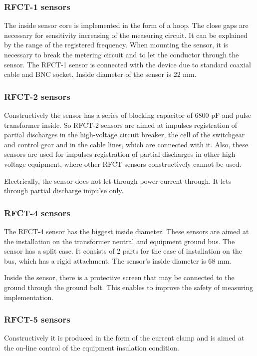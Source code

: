 \subsubsection{RFCT-1 sensors}
The inside sensor core is implemented in the form of a hoop. The close gaps are necessary for sensitivity increasing of the measuring circuit. It can be explained by the range of the registered frequency. When mounting the sensor, it is necessary to break the metering circuit and to let the conductor through the sensor. The RFCT-1 sensor is connected with the device due to standard coaxial cable and BNC socket. Inside diameter of the sensor is 22 mm. 

\subsubsection{RFCT-2 sensors}
Constructively the sensor has a series of blocking capacitor of 6800 pF and pulse transformer inside. So RFCT-2 sensors are aimed at impulses registration of partial discharges in the high-voltage circuit breaker, the cell of the switchgear and control gear and in the cable lines, which are connected with it. Also, these sensors are used for impulses registration of partial discharges in other high-voltage equipment, where other RFCT sensors constructively cannot be used.

Electrically, the sensor does not let through power current through. It lets through partial discharge impulse only.

\subsubsection{RFCT-4 sensors}
The RFCT-4 sensor has the biggest inside diameter. These sensors are aimed at the installation on the transformer neutral and equipment ground bus. The sensor has a split case. It consists of 2 parts for the ease of installation on the bus, which has a rigid attachment. The sensor’s inside diameter is 68 mm.

Inside the sensor, there is a protective screen that may be connected to the ground through the ground bolt. This enables to improve the safety of measuring implementation.

\subsubsection{RFCT-5 sensors}
Constructively it is produced in the form of the current clamp and is aimed at the on-line control of the equipment insulation condition.


